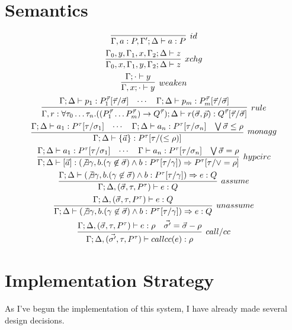 \section{Semantics}
\newcommand{\ds}{\vdash}
\begin{gather*}
  \infer[id]{\Gamma, a : P, \Gamma'; \Delta \ds a : P}{}\\
  \infer[xchg]{\Gamma_0, x, \Gamma_1, y, \Gamma_2; \Delta \ds z}{\Gamma_0, y, \Gamma_1, x, \Gamma_2; \Delta \ds z}\\
  \infer[weaken]{\Gamma, x; \cdot \ds y}{\Gamma; \cdot \ds y}\\
  \infer[rule]{\Gamma, r : \forall \tau_0 \ldots \tau_n. ((P_1^{\vec{\tau}} \ldots P_m^{\vec{\tau}}) \rightarrow Q^{\vec{\tau}}); \Delta \ds r(\vec{\sigma}, \vec{p}) : Q^{\vec{\tau}}[\vec{\tau}/\vec{\sigma}]}{\Gamma; \Delta \ds p_1 : P_1^{\vec{\tau}}[\vec{\tau}/\vec{\sigma}] & \cdots & \Gamma; \Delta \ds p_m : P_m^{\vec{\tau}}[\vec{\tau}/\vec{\sigma}]}\\
  \infer[monagg]{\Gamma; \Delta \ds \{\vec{a}\} : P^\tau[\tau/(\leq \rho)]}{\Gamma; \Delta \ds a_1 : P^\tau[\tau/\sigma_1] & \cdots & \Gamma; \Delta \ds a_n : P^\tau[\tau/\sigma_n] & \bigvee \vec{\sigma} \leq \rho}\\
  \infer[hypcirc]{\Gamma; \Delta\vdash [\vec{a}] : (\not \exists \gamma, b. (\gamma \not \in \vec{\sigma}) \wedge b : P^\tau[\tau/\gamma]) \Rightarrow P^\tau[\tau/\vee = \rho]}{\Gamma; \Delta \ds a_1 : P^\tau[\tau/\sigma_1] & \cdots & \Gamma \ds a_n : P^\tau[\tau/\sigma_n] & \bigvee \vec{\sigma} = \rho}\\
  \infer[assume]{\Gamma; \Delta, (\vec{\sigma}, \tau, P^\tau) \ds e : Q}{\Gamma; \Delta \ds (\not \exists \gamma, b. (\gamma \not \in \vec{\sigma}) \wedge b : P^\tau[\tau/\gamma]) \Rightarrow e : Q}\\
  \infer[unassume]{\Gamma; \Delta \ds (\not \exists \gamma, b. (\gamma \not \in \vec{\sigma}) \wedge b : P^\tau[\tau/\gamma]) \Rightarrow e : Q}{\Gamma; \Delta, (\vec{\sigma}, \tau, P^\tau) \ds e : Q}\\
  \infer[call/cc]{\Gamma; \Delta, (\vec{\sigma'}, \tau, P^\tau) \ds callcc(e) : \rho}{\Gamma; \Delta, (\vec{\sigma}, \tau, P^\tau) \ds e : \rho & \vec{\sigma'} = \vec{\sigma} - \rho}
\end{gather*}

\section{Implementation Strategy}
\label{sec:impl}
As I've begun the implementation of this system, I have already made several design decisions.

